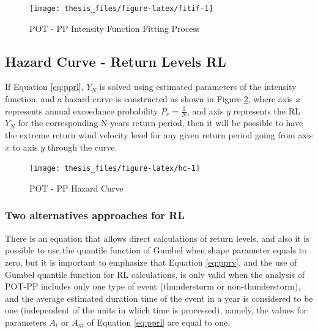 \documentclass[12pt,oneside]{reedthesis}
\begin{document}
\footnotesize
\begin{figure}

{\centering \texttt{[image: thesis\_files/figure-latex/fitif-1]} 

}

\caption{POT - PP Intensity Function Fitting Process}\label{fig:fitif}
\end{figure}
\normalsize

\hypertarget{hazard-curve---return-levels-rl}{%
\subsection{Hazard Curve - Return Levels RL}\label{hazard-curve---return-levels-rl}}

If Equation \eqref{eq:pprl}, \(Y_N\) is solved using estimated parameters of the intensity function, and a hazard curve is constructed as shown in Figure \ref{fig:hc}, where axis \(x\) represents annual exceedance probability \(P_e = \frac{1}{N}\), and axis \(y\) represents the RL \(Y_N\) for the corresponding N-years return period, then it will be possible to have the extreme return wind velocity level for any given return period going from axis \(x\) to axis \(y\) through the curve.

\footnotesize
\begin{figure}

{\centering \texttt{[image: thesis\_files/figure-latex/hc-1]} 

}

\caption{POT - PP Hazard Curve}\label{fig:hc}
\end{figure}
\normalsize

\hypertarget{two-alternatives-approaches-for-rl}{%
\subsubsection{Two alternatives approaches for RL}\label{two-alternatives-approaches-for-rl}}

There is an equation that allows direct calculations of return levels, and also it is possible to use the quantile function of Gumbel when shape parameter equals to zero, but it is important to emphasize that Equation \eqref{eq:pprv}, and the use of Gumbel quantile function for RL calculations, is only valid when the analysis of POT-PP includes only one type of event (thunderstorm or non-thunderstorm), and the average estimated duration time of the event in a year is considered to be one (independent of the units in which time is processed), namely, the values for parameters \(A_t\) or \(A_{nt}\) of Equation \eqref{eq:pprl} are equal to one.
\end{document}
